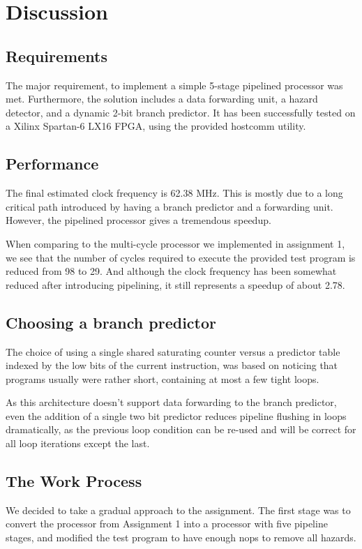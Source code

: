 \chapter{Discussion}

\section{Requirements}
The major requirement, to implement a simple 5-stage pipelined processor was met.
Furthermore, the solution includes a data forwarding unit, a hazard detector, and a dynamic 2-bit branch predictor.
It has been successfully tested on a Xilinx Spartan-6 LX16 FPGA, using the provided hostcomm\cite{hostcomm} utility.

\section{Performance}

The final estimated clock frequency is 62.38 MHz.
This is mostly due to a long critical path introduced by having a branch predictor and a forwarding unit.
However, the pipelined processor gives a tremendous speedup.

When comparing to the multi-cycle processor we implemented in assignment 1, we see that the number of cycles required to execute the provided test program is reduced from 98 to 29.
And although the clock frequency has been somewhat reduced after introducing pipelining, it still represents a speedup of about 2.78.


\section{Choosing a branch predictor}
The choice of using a single shared saturating counter versus a predictor table indexed by the low bits of the current instruction, was based on noticing that programs usually were rather short, containing at most a few tight loops.

As this architecture doesn't support data forwarding to the branch predictor, even the addition of a single two bit predictor reduces pipeline flushing in loops dramatically, as the previous loop condition can be re-used and will be correct for all loop iterations except the last.

\section{The Work Process}
We decided to take a gradual approach to the assignment.
The first stage was to convert the processor from Assignment 1 into a processor with five pipeline stages, and modified the test program to have enough nops to remove all hazards.

